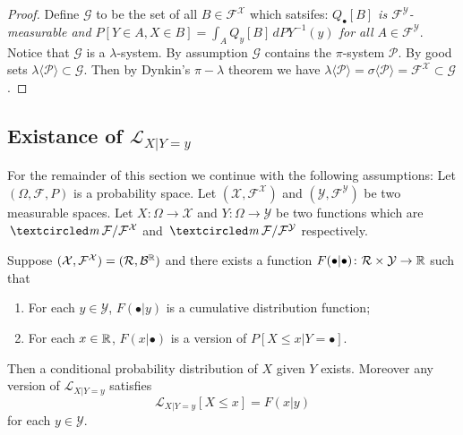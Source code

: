 \begin{proof}
Define $\mathcal G$ to be the set of all  $B\in\mathcal F^{\mathcal X}$ which satsifes:  {\it $Q_\bullet[B]$ is $\mathcal F^{\mathcal Y}$-measurable and $P[Y\in A, X\in B] = \int_A Q_y[B]\, dPY^{-1}(y) $ for all $A\in \mathcal F^{\mathcal Y}$}. Notice that $\mathcal G$ is a $\lambda$-system. By assumption $\mathcal G$ contains the $\pi$-system $\mathcal P$. By good sets $\lambda \langle \mathcal P \rangle \subset \mathcal G$. Then by Dynkin's $\pi\!-\!\lambda$ theorem we have $\lambda \langle \mathcal P \rangle = \sigma\langle \mathcal P \rangle = \mathcal F^{\mathcal X}\subset \mathcal G$.
\end{proof}



\subsection{Existance of $\mathcal L_{X|Y=y}$}

\begin{sectionassumption}
For the remainder of this section we continue with the following assumptions: Let  $(\Omega, \mathcal F, P)$ is  a probability space. Let $(\mathcal X, \mathcal F^{\mathcal X})$ and $(\mathcal Y, \mathcal F^{\mathcal Y})$ be two measurable spaces. Let $X\colon \Omega \rightarrow\mathcal X$ and $Y\colon \Omega\rightarrow \mathcal Y$ be two functions which are $\mcirc \mathcal F/\mathcal F^{\mathcal X}$ and $\mcirc \mathcal F/\mathcal F^{\mathcal Y}$ respectively.
\end{sectionassumption}


\begin{lemma}
Suppose $(\mathcal X,\mathcal F^{\mathcal X}) = (\mathcal R, \mathcal B^{\Bbb R})$ and there exists a function $F(\bullet | \bullet)\colon \mathcal R \times \mathcal Y\rightarrow \Bbb R$ such that
\begin{enumerate}
\item For each $y\in \mathcal Y$, $F(\bullet|y)$ is a cumulative distribution function;
\item For each $x \in \Bbb R$, $F(x | \bullet)$ is a version of $P[X\leq x | Y=\bullet]$.
\end{enumerate}
Then a conditional probability distribution of $X$ given $Y$ exists. Moreover any version of $\mathcal L_{X|Y=y}$ satisfies
\[\mathcal L_{X|Y=y}[X\leq x] = F(x|y)  \]
for each $y\in\mathcal Y$.
\end{lemma}



